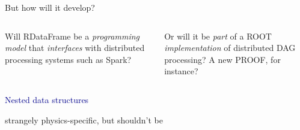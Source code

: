 \documentclass[aspectratio=169]{beamer}
\begin{document}
\begin{frame}{But how will it develop?}
\Large
\vspace{0.5 cm}
\begin{columns}
Will RDataFrame be a {\it programming model} that {\it interfaces} with distributed processing systems such as Spark?

\vspace{0.5 cm}
Or will it be {\it part} of a ROOT {\it implementation} of distributed DAG processing? A new PROOF, for instance?
\end{columns}

\vspace{1 cm}
\end{frame}

\begin{frame}{}
\huge
\vspace{0.5 cm}
\begin{center}
\textcolor{darkblue}{Nested data structures}

\large
\vspace{0.5 cm}
strangely physics-specific, but shouldn't be
\end{center}
\end{frame}
\end{document}
